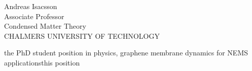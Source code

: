 \documentclass{letter}
\begin{document}
\begin{letter}{Andreas Isacsson\\
Associate Professor\\
Condensed Matter Theory\\
CHALMERS UNIVERSITY OF TECHNOLOGY}

\begin{content}{the PhD student position in physics, graphene
membrane dynamics for NEMS applications}{this position}
\teaching

\phdmot

\end{content}

\end{letter}
\end{document}
